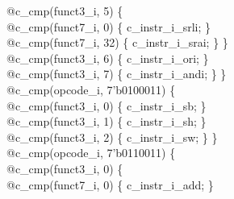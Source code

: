 {\indent \hspace{\parindent} \hspace{\parindent} @c\_cmp(funct3\_i, 5) \{ \\%
\indent \hspace{\parindent} \hspace{\parindent} \hspace{\parindent}	@c\_cmp(funct7\_i, 0) \{ c\_instr\_i\_srli; \}\\%
\indent \hspace{\parindent} \hspace{\parindent} \hspace{\parindent}	@c\_cmp(funct7\_i, 32) \{ c\_instr\_i\_srai; \} \}\\%
\indent \hspace{\parindent} \hspace{\parindent} @c\_cmp(funct3\_i, 6) \{ c\_instr\_i\_ori; \}\\%
\indent \hspace{\parindent} \hspace{\parindent} @c\_cmp(funct3\_i, 7) \{ c\_instr\_i\_andi; \} \}\\%
\indent \hspace{\parindent} @c\_cmp(opcode\_i, 7'b0100011) \{\\%
\indent \hspace{\parindent} \hspace{\parindent} @c\_cmp(funct3\_i, 0) \{ c\_instr\_i\_sb; \}\\%
\indent \hspace{\parindent} \hspace{\parindent} @c\_cmp(funct3\_i, 1) \{ c\_instr\_i\_sh; \}\\%
\indent \hspace{\parindent} \hspace{\parindent} @c\_cmp(funct3\_i, 2) \{ c\_instr\_i\_sw; \} \}\\%
\indent \hspace{\parindent} @c\_cmp(opcode\_i, 7'b0110011) \{\\%
\indent \hspace{\parindent} \hspace{\parindent} @c\_cmp(funct3\_i, 0) \{\\%
\indent \hspace{\parindent} \hspace{\parindent} \hspace{\parindent}	@c\_cmp(funct7\_i, 0) \{ c\_instr\_i\_add; \}\\%
}
